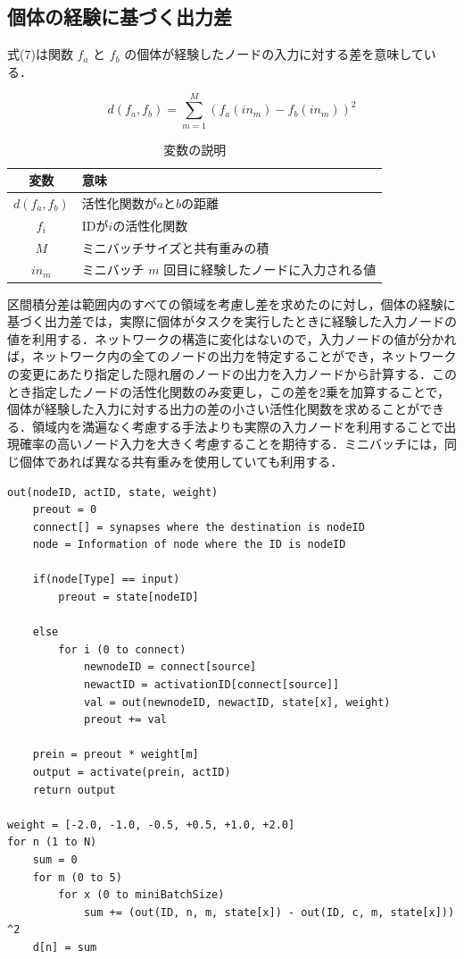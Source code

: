 \subsection{個体の経験に基づく出力差}
式(7)は関数 $ f_a $ と $ f_b $ の個体が経験したノードの入力に対する差を意味している．

\begin{equation}
    d(f_{a}, f_{b}) = \sum_{m=1}^{M}(f_{a}(in_{m}) - f_{b}(in_{m}))^2
\end{equation}

\begin{table}[H]
    \caption{変数の説明}
    \centering
    \begin{tabular}{cl}
        \hline
        変数  & 意味 \\
        \hline \hline
        $d(f_{a}, f_{b})$ & 活性化関数が$a$と$b$の距離                 \\
        $f_{i}$           & IDが$i$の活性化関数                        \\
        $M$               & ミニバッチサイズと共有重みの積             \\
        $in_m$            & ミニバッチ $m$ 回目に経験したノードに入力される値 \\
        \hline
    \end{tabular}
\end{table}

区間積分差は範囲内のすべての領域を考慮し差を求めたのに対し，個体の経験に基づく出力差では，実際に個体がタスクを実行したときに経験した入力ノードの値を利用する．ネットワークの構造に変化はないので，入力ノードの値が分かれば，ネットワーク内の全てのノードの出力を特定することができ，ネットワークの変更にあたり指定した隠れ層のノードの出力を入力ノードから計算する．このとき指定したノードの活性化関数のみ変更し，この差を2乗を加算することで，個体が経験した入力に対する出力の差の小さい活性化関数を求めることができる．領域内を満遍なく考慮する手法よりも実際の入力ノードを利用することで出現確率の高いノード入力を大きく考慮することを期待する．ミニバッチには，同じ個体であれば異なる共有重みを使用していても利用する．

\begin{lstlisting}[caption=経験入力に基づく出力差のプログラム]
out(nodeID, actID, state, weight)
    preout = 0
    connect[] = synapses where the destination is nodeID
    node = Information of node where the ID is nodeID

    if(node[Type] == input)
        preout = state[nodeID]
    
    else
        for i (0 to connect)
            newnodeID = connect[source]
            newactID = activationID[connect[source]]
            val = out(newnodeID, newactID, state[x], weight)
            preout += val
    
    prein = preout * weight[m]
    output = activate(prein, actID)
    return output

weight = [-2.0, -1.0, -0.5, +0.5, +1.0, +2.0]
for n (1 to N)
    sum = 0
    for m (0 to 5)
        for x (0 to miniBatchSize)
            sum += (out(ID, n, m, state[x]) - out(ID, c, m, state[x])) ^2
    d[n] = sum
\end{lstlisting}

